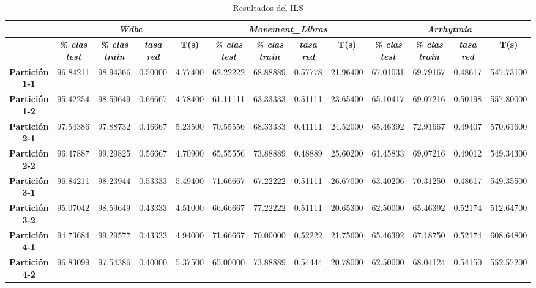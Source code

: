 \documentclass[a4paper,11pt]{article}
\begin{document}
  
  \begin{table}[H]
  \caption{Resultados del ILS}
  \begin{adjustbox}{width=1.1\textwidth}
  \begin{tabular}{|c|r|r|r|r|r|r|r|r|r|r|r|r|}
  \hline
  \multicolumn{1}{|l|}{} & \multicolumn{ 4}{c|}{\textbf{\textit{Wdbc}}} & \multicolumn{ 4}{c|}{\textbf{\textit{Movement\_Libras}}} & \multicolumn{ 4}{c|}{\textbf{\textit{Arrhytmia}}} \\ \hline
  \multicolumn{1}{|l|}{} & \multicolumn{1}{c|}{\textbf{\textit{\% clas test}}} & \multicolumn{1}{c|}{\textbf{\textit{\% clas train}}} & \multicolumn{1}{c|}{\textbf{\textit{tasa red}}} & \multicolumn{1}{c|}{\textbf{T(s)}} & \multicolumn{1}{c|}{\textbf{\textit{\% clas test}}} & \multicolumn{1}{c|}{\textbf{\textit{\% clas train}}} & \multicolumn{1}{c|}{\textbf{\textit{tasa red}}} & \multicolumn{1}{c|}{\textbf{T(s)}} & \multicolumn{1}{c|}{\textbf{\textit{\% clas test}}} & \multicolumn{1}{c|}{\textbf{\textit{\% clas train}}} & \multicolumn{1}{c|}{\textbf{\textit{tasa red}}} & \multicolumn{1}{c|}{\textbf{T(s)}} \\ \hline
  \textbf{Partición 1-1} & 96.84211 & 98.94366 & 0.50000 & 4.77400 & 62.22222 & 68.88889 & 0.57778 & 21.96400 & 67.01031 & 69.79167 & 0.48617 & 547.73100 \\ \hline
  \textbf{Partición 1-2} & 95.42254 & 98.59649 & 0.66667 & 4.78400 & 61.11111 & 63.33333 & 0.51111 & 23.65400 & 65.10417 & 69.07216 & 0.50198 & 557.80000 \\ \hline
  \textbf{Partición 2-1} & 97.54386 & 97.88732 & 0.46667 & 5.23500 & 70.55556 & 68.33333 & 0.41111 & 24.52000 & 65.46392 & 72.91667 & 0.49407 & 570.61600 \\ \hline
  \textbf{Partición 2-2} & 96.47887 & 99.29825 & 0.56667 & 4.70900 & 65.55556 & 73.88889 & 0.48889 & 25.60200 & 61.45833 & 69.07216 & 0.49012 & 549.34300 \\ \hline
  \textbf{Partición 3-1} & 96.84211 & 98.23944 & 0.53333 & 5.49400 & 71.66667 & 67.22222 & 0.51111 & 26.67000 & 63.40206 & 70.31250 & 0.48617 & 549.35500 \\ \hline
  \textbf{Partición 3-2} & 95.07042 & 98.59649 & 0.43333 & 4.51000 & 66.66667 & 77.22222 & 0.51111 & 20.65300 & 62.50000 & 65.46392 & 0.52174 & 512.64700 \\ \hline
  \textbf{Partición 4-1} & 94.73684 & 99.29577 & 0.43333 & 4.94000 & 71.66667 & 70.00000 & 0.52222 & 21.75600 & 65.46392 & 67.18750 & 0.52174 & 608.64800 \\ \hline
  \textbf{Partición 4-2} & 96.83099 & 97.54386 & 0.40000 & 5.37500 & 65.00000 & 73.88889 & 0.54444 & 20.78000 & 62.50000 & 68.04124 & 0.54150 & 552.57200 \\ \hline

\end{tabular}
\end{adjustbox}
\end{table}
\end{document}
